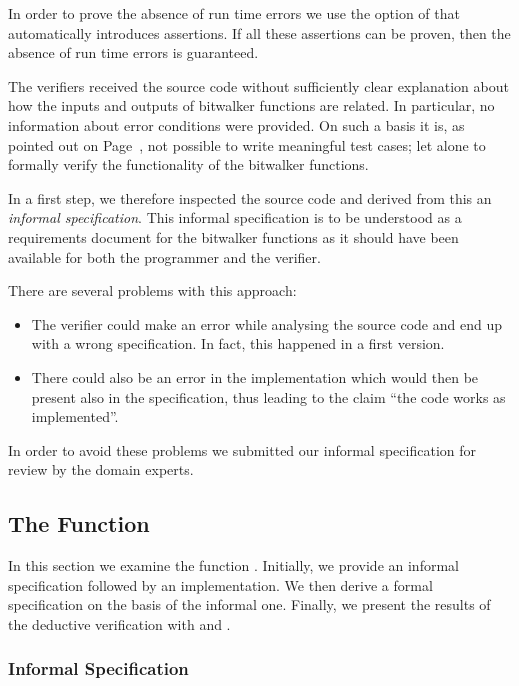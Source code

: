 In order to prove the absence of run time errors we use
the  option of \wpframac that automatically introduces \acsl
assertions. If all these assertions can be proven, then
the absence of run time errors is guaranteed.


\begin{framed}
The verifiers received the source code without sufficiently clear explanation
about how the inputs and outputs of bitwalker functions are related.
In particular, no information about error conditions were provided.
On such a basis it is, as pointed out on Page~\pageref{lesson},
not possible to write meaningful test cases;
let alone to formally verify the functionality of the bitwalker functions.

In a first step, we therefore inspected the source code and 
derived from this an \emph{informal specification}.
This informal specification is to be understood
as a requirements document for the bitwalker functions as it should have been
available for both the programmer and the verifier.

There are several problems with this approach:
\begin{itemize}
\item
The verifier could make an error while analysing the source code
and end up with a wrong specification. 
In fact, this happened in a first version.

\item
There could also be an error in the implementation which would then be present also
in the specification, thus leading to the claim ``the code works as implemented''.
\end{itemize}

In order to avoid these problems we submitted our informal specification
for review by the domain experts.
\end{framed}

\clearpage

\subsection{The Function \peek}
\label{peek}


In this section we examine the function \peek.
Initially, we provide an informal specification followed by an implementation.
We then derive a formal specification on the basis of the informal one. 
Finally, we present the results of the deductive verification with \framac and \wpframac.


\subsubsection{Informal Specification}
\label{informal-peek}


